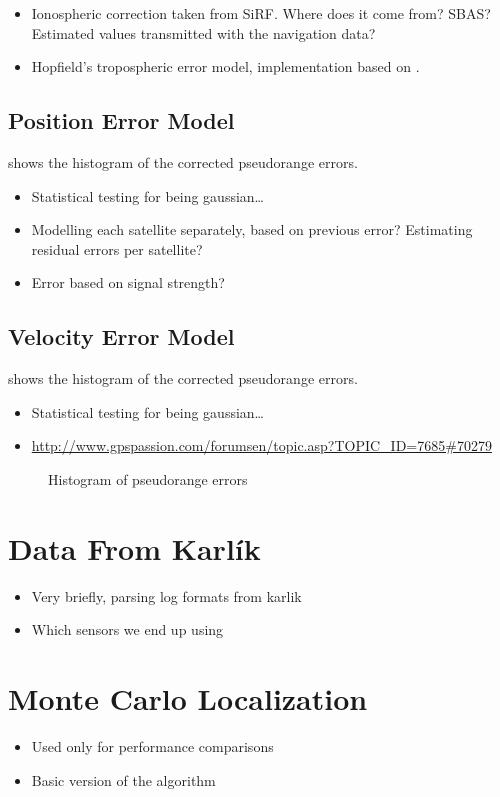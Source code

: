 \begin{itemize}
\item Ionospheric correction taken from SiRF. Where does it come from? SBAS?
    Estimated values transmitted with the navigation data?
\item Hopfield's tropospheric error model, implementation based on \cite{sam-www}.
\end{itemize}

\subsection{Position Error Model}
 shows the histogram of the corrected pseudorange
errors.
\begin{itemize}
\item Statistical testing for being gaussian\ldots
\item Modelling each satellite separately, based on previous error?
      Estimating residual errors per satellite?
\item Error based on signal strength?
\end{itemize}

\subsection{Velocity Error Model}
 shows the histogram of the corrected pseudorange
errors.
\begin{itemize}
\item Statistical testing for being gaussian\ldots
\item \url{http://www.gpspassion.com/forumsen/topic.asp?TOPIC_ID=7685#70279}
\end{itemize}

\begin{figure}[tp]
	\centering
	\caption{Histogram of pseudorange errors}
	\label{fig:impl-error-histogam}
\end{figure}

\section{Data From Karlík}
\begin{itemize}
\item Very briefly, parsing log formats from karlik
\item Which sensors we end up using
\end{itemize}

\section{Monte Carlo Localization}
\begin{itemize}
\item Used only for performance comparisons
\item Basic version of the algorithm
\end{itemize}

